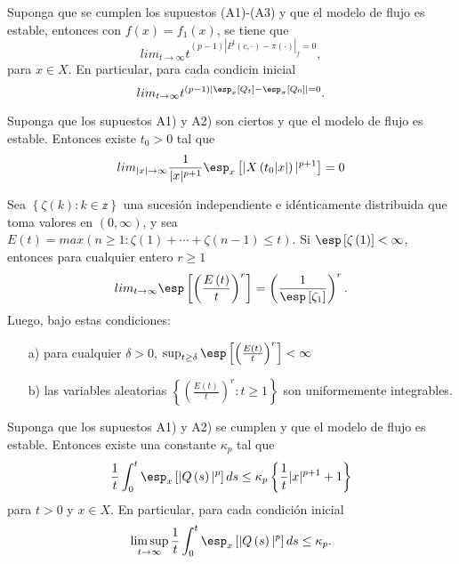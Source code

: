 \begin{Teo}\label{Tma.6.3}
Suponga que se cumplen los supuestos (A1)-(A3) y que el modelo de
flujo es estable, entonces con
$f\left(x\right)=f_{1}\left(x\right)$, se tiene que
\[lim_{t\rightarrow\infty}t^{(p-1)\left|P^{t}\left(c,\cdot\right)-\pi\left(\cdot\right)\right|_{f}=0},\]
para $x\in X$. En particular, para cada condicin inicial
\[lim_{t\rightarrow\infty}t^{(p-1)\left|\esp_{x}\left[Q_{t}\right]-\esp_{\pi}\left[Q_{0}\right]\right|=0}.\]
\end{Teo}


\begin{Prop}\label{Prop.5.1.DaiSean}
Suponga que los supuestos A1) y A2) son ciertos y que el modelo de flujo es estable. Entonces existe $t_{0}>0$ tal que
\begin{equation}
lim_{|x|\rightarrow\infty}\frac{1}{|x|^{p+1}}\esp_{x}\left[|X\left(t_{0}|x|\right)|^{p+1}\right]=0
\end{equation}
\end{Prop}

\begin{Lemma}\label{Lema.5.2.DaiSean}
 Sea $\left\{\zeta\left(k\right):k\in \mathbb{z}\right\}$ una sucesi\'on independiente e id\'enticamente distribuida que toma valores en $\left(0,\infty\right)$,
y sea
$E\left(t\right)=max\left(n\geq1:\zeta\left(1\right)+\cdots+\zeta\left(n-1\right)\leq
t\right)$. Si $\esp\left[\zeta\left(1\right)\right]<\infty$,
entonces para cualquier entero $r\geq1$
\begin{equation}
 lim_{t\rightarrow\infty}\esp\left[\left(\frac{E\left(t\right)}{t}\right)^{r}\right]=\left(\frac{1}{\esp\left[\zeta_{1}\right]}\right)^{r}.
\end{equation}
Luego, bajo estas condiciones:
\begin{itemize}
 \item[a)] para cualquier $\delta>0$, $\sup_{t\geq\delta}\esp\left[\left(\frac{E\left(t\right)}{t}\right)^{r}\right]<\infty$
\item[b)] las variables aleatorias
$\left\{\left(\frac{E\left(t\right)}{t}\right)^{r}:t\geq1\right\}$
son uniformemente integrables.
\end{itemize}
\end{Lemma}

\begin{Teo}\label{Tma.5.5.DaiSean}
Suponga que los supuestos A1) y A2) se cumplen y que el modelo de
flujo es estable. Entonces existe una constante $\kappa_{p}$ tal
que
\begin{equation}
\frac{1}{t}\int_{0}^{t}\esp_{x}\left[|Q\left(s\right)|^{p}\right]ds\leq\kappa_{p}\left\{\frac{1}{t}|x|^{p+1}+1\right\}
\end{equation}
para $t>0$ y $x\in X$. En particular, para cada condici\'on
inicial
\begin{eqnarray*}
\limsup_{t\rightarrow\infty}\frac{1}{t}\int_{0}^{t}\esp_{x}\left[|Q\left(s\right)|^{p}\right]ds\leq\kappa_{p}.
\end{eqnarray*}
\end{Teo}

